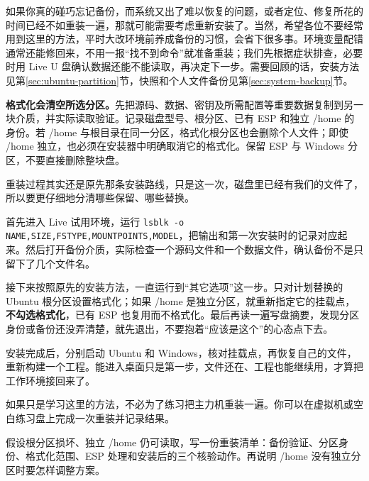 如果你真的碰巧忘记备份，而系统又出了难以恢复的问题，或者定位、修复所花的时间已经不如重装一遍，那就可能需要考虑重新安装了。当然，希望各位不要经常用到这里的方法，平时大改环境前养成备份的习惯，会省下很多事。环境变量配错通常还能修回来，不用一报“找不到命令”就准备重装；我们先根据症状排查，必要时用 Live U 盘确认数据还能不能读取，再决定下一步。需要回顾的话，安装方法见第\ref{sec:ubuntu-partition}节，快照和个人文件备份见第\ref{sec:system-backup}节。

\begin{note}
\textbf{格式化会清空所选分区。}先把源码、数据、密钥及所需配置等重要数据复制到另一块介质，并实际读取验证。记录磁盘型号、根分区、已有 ESP 和独立 /home 的身份。若 /home 与根目录在同一分区，格式化根分区也会删除个人文件；即使 /home 独立，也必须在安装器中明确取消它的格式化。保留 ESP 与 Windows 分区，不要直接删除整块盘。
\end{note}

\begin{example}[重装前的核对流程]
重装过程其实还是原先那条安装路线，只是这一次，磁盘里已经有我们的文件了，所以要更仔细地分清哪些保留、哪些替换。

首先进入 Live 试用环境，运行 \texttt{lsblk -o NAME,SIZE,FSTYPE,MOUNTPOINTS,MODEL}，把输出和第一次安装时的记录对应起来。然后打开备份介质，实际检查一个源码文件和一个数据文件，确认备份不是只留下了几个文件名。

接下来按照原先的安装方法，一直运行到“其它选项”这一步。只对计划替换的 Ubuntu 根分区设置格式化；如果 /home 是独立分区，就重新指定它的挂载点，\textbf{不勾选格式化}，已有 ESP 也复用而不格式化。最后再读一遍写盘摘要，发现分区身份或备份还没弄清楚，就先退出，不要抱着“应该是这个”的心态点下去。

安装完成后，分别启动 Ubuntu 和 Windows，核对挂载点，再恢复自己的文件，重新构建一个工程。能进入桌面只是第一步，文件还在、工程也能继续用，才算把工作环境接回来了。

如果只是学习这里的方法，不必为了练习把主力机重装一遍。你可以在虚拟机或空白练习盘上完成一次重装并记录结果。
\end{example}
\begin{exercise}\label{ex:v1-reinstall-plan}
假设根分区损坏、独立 /home 仍可读取，写一份重装清单：备份验证、分区身份、格式化范围、ESP 处理和安装后的三个核验动作。再说明 /home 没有独立分区时要怎样调整方案。
\end{exercise}
